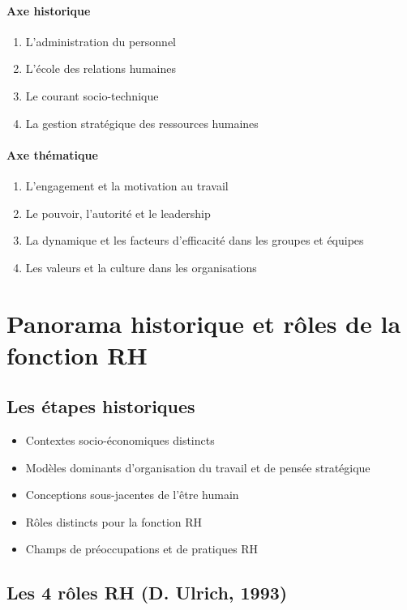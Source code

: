 \documentclass[12pt]{article}
\begin{document}
    \paragraph{Axe historique}
      \begin{enumerate}
       \item L'administration du personnel
       \item L'école des relations humaines
       \item Le courant socio-technique
       \item La gestion stratégique des ressources humaines
      \end{enumerate}
    
    \paragraph{Axe thématique}
      \begin{enumerate}
       \item L'engagement et la motivation au travail
       \item Le pouvoir, l'autorité et le leadership
       \item La dynamique et les facteurs d'efficacité dans les groupes et équipes
       \item Les valeurs et la culture dans les organisations
      \end{enumerate}

\section{Panorama historique et rôles de la fonction RH}
	\subsection{Les étapes historiques}
	  \begin{itemize}
	   \item Contextes socio-économiques distincts
	   \item Modèles dominants d'organisation du travail et de pensée stratégique
	   \item Conceptions sous-jacentes de l'être humain
	   \item Rôles distincts pour la fonction RH
	   \item Champs de préoccupations et de pratiques RH
	  \end{itemize}
	  
	  \subsection{Les 4 rôles RH (D. Ulrich, 1993)}
	  
\end{document}
